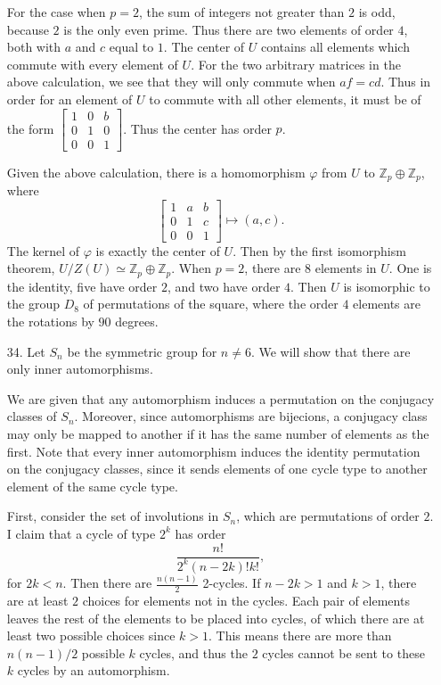 \documentclass[11pt, reqno]{article}
\theoremstyle{plain}
\theoremstyle{definition}
\theoremstyle{remark}
\renewcommand{\phi}{\varphi}
\newcommand{\ZZ}{\mathbb{Z}}
\begin{document}
\begin{enumerate}
    For the case when $p = 2$, the sum of integers not greater than $2$ is odd, because $2$ is the only even prime. Thus 
    there are two elements of order $4$, both with $a$ and $c$ equal to $1$.
    \bigbreak
    The center of $U$ contains all elements which commute with every element of $U$. For the two arbitrary matrices in the 
    above calculation, we see that they will only commute when $af = cd$. Thus in order for an element of $U$ to commute with 
    all other elements, it must be of the form $\left[\begin{smallmatrix}1 & 0 & b \\ 0 & 1 & 0 \\ 0 & 0 & 1\end{smallmatrix}\right]$.
    Thus the center has order $p$. 

    Given the above calculation, there is a homomorphism $\phi$ from $U$ to $\ZZ_p \oplus \ZZ_p$, where 
    \[
        \begin{bmatrix}1 & a & b \\ 0 & 1 & c \\ 0 & 0 & 1\end{bmatrix} \mapsto (a,c).
    \]
    The kernel of $\phi$ is exactly the center of $U$. Then by the first isomorphism theorem, $U/Z(U) \simeq \ZZ_p\oplus\ZZ_p$.
    \bigbreak
    When $p = 2$, there are $8$ elements in $U$. One is the identity, five have order $2$, and two have order $4$. Then 
    $U$ is isomorphic to the group $D_8$ of permutations of the square, where the order $4$ elements are the rotations by $90$ 
    degrees. 

    \item[34.] Let $S_n$ be the symmetric group for $n \neq 6$. We will show that there are only inner automorphisms.
    
    We are given that any automorphism induces a permutation on the conjugacy classes of $S_n$. Moreover, since 
    automorphisms are bijecions, a conjugacy class may only be mapped to another if it has the same number of elements 
    as the first. Note that every inner automorphism induces the identity permutation on the conjugacy classes, since it sends 
    elements of one cycle type to another element of the same cycle type.

    First, consider the set of involutions in $S_n$, which are permutations of order $2$. I claim that a cycle of type 
    $2^k$ has order
    \[  
        \frac{n!}{2^k(n-2k)!k!},
    \]
    for $2k < n$. Then there are $\frac{n(n-1)}{2}$ 2-cycles. If $n-2k > 1$ and $k > 1$, there are at least $2$ choices
    for elements not in the cycles. Each pair of elements leaves the rest of the elements to be placed into cycles, 
    of which there are at least two possible choices since $k > 1$. This means there are more than $n(n-1)/2$ 
    possible $k$ cycles, and thus the $2$ cycles cannot be sent to these $k$ cycles by an automorphism.


\end{enumerate}
\end{document}
